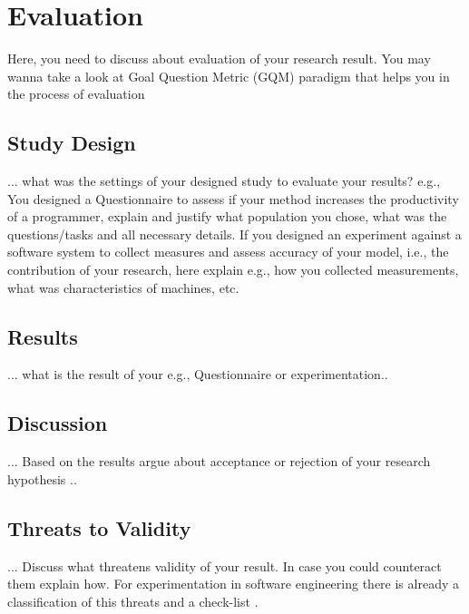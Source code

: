
\chapter{Evaluation}
\label{chap:evaluation}

Here, you need to discuss about evaluation of your research result. You may wanna take a look at Goal Question Metric (GQM) paradigm that helps you in the process of evaluation \cite{caldiera1994goal}

\section{Study Design}
... what was the settings of your designed study to evaluate your results? e.g., You designed a Questionnaire to assess if your method increases the productivity of a programmer, explain and justify what population you chose, what was the questions/tasks and all necessary details. If you designed an experiment against a software system to collect measures and assess accuracy of your model, i.e., the contribution of your research, here explain e.g., how you collected measurements, what was characteristics of machines, etc.

\section{Results}
... what is the result of your e.g., Questionnaire or experimentation.. 

\section{Discussion}
... Based on the results argue about acceptance or rejection of your research hypothesis   .. 

\section{Threats to Validity}
... Discuss what threatens validity of your result. In case you could counteract them explain how. For experimentation in software engineering there is already a classification of this threats and a check-list \cite{DBLP:journals/ese/RunesonH09}.   

